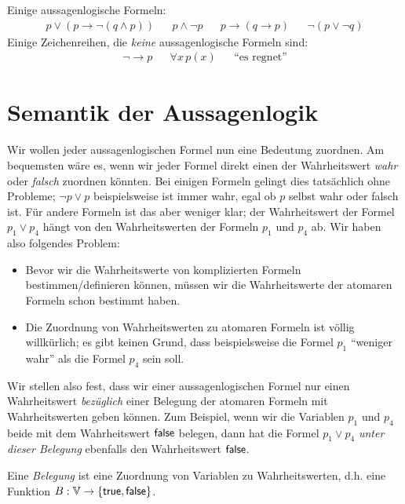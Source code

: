 \begin{bsp}
Einige aussagenlogische Formeln:
\begin{align*}
&p\lor(p\to \neg(q\land p))&&p\land\neg p&&p\to(q\to p)& &\neg(p\lor\neg q)&
\end{align*}
Einige Zeichenreihen, die \textit{keine} aussagenlogische Formeln sind:
\begin{align*}
&\neg\to p& &\forall x\,p(x)& &\text{``es regnet''}&
\end{align*}
\end{bsp}

\section{Semantik der Aussagenlogik}

Wir wollen jeder aussagenlogischen Formel nun eine Bedeutung zuordnen. Am bequemsten wäre es, wenn wir jeder Formel
direkt einen der Wahrheitswert \textit{wahr} oder \textit{falsch} zuordnen könnten. Bei
einigen Formeln gelingt dies tatsächlich ohne
Probleme; $\neg p\lor p$ beispielsweise ist immer wahr, egal ob $p$ selbst wahr oder falsch ist. Für andere Formeln ist das aber
weniger klar; der Wahrheitswert der Formel $p_1\lor p_4$ hängt von den Wahrheitswerten der Formeln $p_1$ und $p_4$ ab. Wir haben also folgendes Problem:
\begin{itemize}
\item Bevor wir die Wahrheitswerte von komplizierten Formeln bestimmen/definieren können, müssen wir die Wahrheitswerte der atomaren Formeln schon bestimmt haben.
\item Die Zuordnung von Wahrheitswerten zu atomaren Formeln ist völlig willkürlich; es gibt keinen Grund, dass beispielsweise die Formel $p_1$ ``weniger wahr'' als die Formel $p_4$ sein soll.
\end{itemize}
Wir stellen also fest, dass wir einer aussagenlogischen Formel nur einen Wahrheitswert
\textit{bezüglich} einer Belegung der atomaren Formeln mit Wahrheitswerten geben können.
Zum Beispiel, wenn wir die Variablen $p_1$ und $p_4$ beide mit dem Wahrheitswert $\mathsf{false}$
belegen, dann hat die Formel $p_1\lor p_4$ \textit{unter dieser Belegung} ebenfalls den
Wahrheitswert $\mathsf{false}$.

\begin{df}
Eine \textit{Belegung} ist eine Zuordnung von Variablen zu Wahrheitswerten, d.h.
eine  Funktion $B:\mathbb{V}\to \{\mathsf{true},\mathsf{false}\}$.
\end{df}

